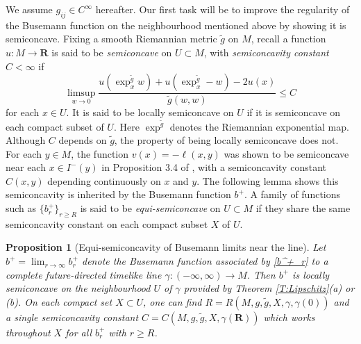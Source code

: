 \documentclass[12pt]{amsart}
\newcommand{\R}{{\mathbf R}}
\newtheorem{proposition}[theorem]{Proposition}
\begin{document}
We assume $g_{ij} \in C^\infty$ hereafter.
Our first task will be to improve the regularity of the Busemann function on the neighbourhood mentioned above by showing it is semiconcave.
Fixing a smooth Riemannian metric $\tilde g$ on $M$, recall a function $u:M \longrightarrow \R$ is said to be {\em semiconcave} on $U\subset M$, with {\em semiconcavity constant} $C<\infty$ if 
$$
\limsup_{w \to 0} \frac{u(\exp^{\tilde g}_x w) + u(\exp^{\tilde g}_x -w) - 2u(x)}{\tilde g(w,w)} \le C
$$
for each $x \in U$. It is said to be locally semiconcave on $U$ if it is semiconcave on each compact subset of $U$.  Here $\exp^{\tilde g}$ denotes the Riemannian exponential map.   Although $C$ depends on $\tilde g$,  the property of being locally semiconcave does not.
For each $y \in M$,  the function $v(x) = -\ell(x,y)$ was shown to be semiconcave near each $x \in I^-(y)$ in Proposition 3.4 of \cite{McCann20}, with a semiconcavity constant $C(x,y)$ depending continuously on $x$ and $y$.   
The following lemma shows this semiconcavity is inherited by the Busemann function $b^+$.
A family of functions such as $\{b^+_r\}_{r \ge R}$ is said to be {\em equi-semiconcave} on $U \subset M$ if they share the same semiconcavity constant on each compact subset $X$ of $U$. 


\begin{proposition}[Equi-semiconcavity of Busemann limits near the line]\label{P:semiconcave}
Let $b^+=\lim_{r \to \infty} b^+_r$ denote the Busemann function associated by \eqref{b^+_r} to a complete future-directed timelike line  $\gamma:(-\infty,\infty)\longrightarrow M$.
Then $b^+$ is locally semiconcave on the neighbourhood $U$ of $\gamma$ provided by Theorem \ref{T:Lipschitz}(a) or (b). 
On each compact set $X \subset U$, 
one can find $R=R(M,g, \tilde g,X,\gamma,\gamma(0))$ and a single semiconcavity constant $C=C(M,g,\tilde g,X,\gamma(\R))$ which works throughout $X$ for all $b^+_r$ with $r \ge R$. 
\end{proposition}
\end{document}
